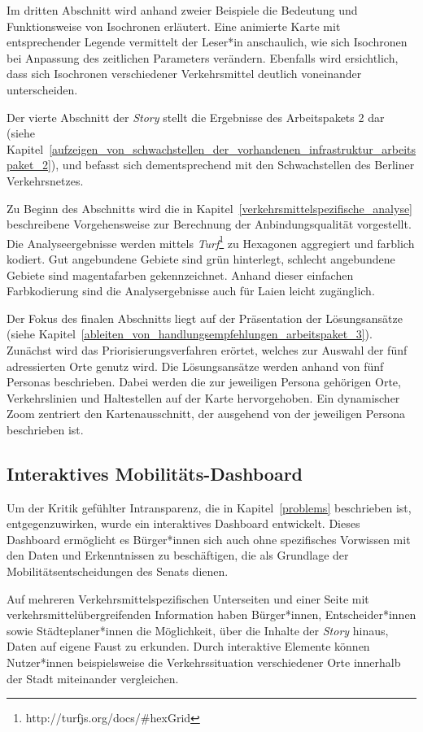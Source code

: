 Im dritten Abschnitt wird anhand zweier Beispiele die Bedeutung und Funktionsweise von Isochronen erläutert. Eine animierte Karte mit entsprechender Legende vermittelt der Leser*in anschaulich, wie sich Isochronen bei Anpassung des zeitlichen Parameters verändern. Ebenfalls wird ersichtlich, dass sich Isochronen verschiedener Verkehrsmittel deutlich voneinander unterscheiden.

Der vierte Abschnitt der \emph{Story} stellt die Ergebnisse des Arbeitspakets 2 dar (siehe Kapitel~\ref{aufzeigen_von_schwachstellen_der_vorhandenen_infrastruktur_arbeitspaket_2}), und befasst sich dementsprechend  mit den Schwachstellen des Berliner Verkehrsnetzes.

Zu Beginn des Abschnitts wird die in Kapitel~\ref{verkehrsmittelspezifische_analyse} beschreibene Vorgehensweise zur Berechnung der Anbindungsqualität vorgestellt. Die Analyseergebnisse werden mittels \emph{Turf}\footnote{http://turfjs.org/docs/\#hexGrid} zu Hexagonen aggregiert und farblich kodiert. Gut angebundene Gebiete sind  grün hinterlegt, schlecht angebundene Gebiete sind magentafarben gekennzeichnet. Anhand dieser einfachen Farbkodierung sind die Analysergebnisse auch für Laien leicht zugänglich.

Der Fokus des finalen Abschnitts liegt auf der Präsentation der Lösungsansätze (siehe Kapitel~\ref{ableiten_von_handlungsempfehlungen_arbeitspaket_3}). Zunächst wird das Priorisierungsverfahren erörtet, welches zur Auswahl der fünf adressierten Orte genutz wird. Die Lösungsansätze werden anhand von fünf Personas beschrieben. Dabei werden die zur jeweiligen Persona gehörigen Orte, Verkehrslinien und Haltestellen auf der Karte hervorgehoben. Ein dynamischer Zoom zentriert den Kartenausschnitt, der ausgehend von der jeweiligen Persona beschrieben ist.

\subsection{Interaktives Mobilitäts-Dashboard}
\label{interaktives_mobilitaets_dashboard}

Um der Kritik gefühlter Intransparenz, die in Kapitel~\ref{problems} beschrieben ist, entgegenzuwirken, wurde ein interaktives Dashboard entwickelt. Dieses Dashboard ermöglicht es Bürger*innen sich auch ohne spezifisches Vorwissen mit den Daten und Erkenntnissen zu beschäftigen, die als Grundlage der Mobilitätsentscheidungen des Senats dienen.

Auf mehreren Verkehrsmittelspezifischen Unterseiten und einer Seite mit verkehrsmittelübergreifenden Information haben Bürger*innen, Entscheider*innen sowie Städteplaner*innen die Möglichkeit, über die Inhalte der \emph{Story} hinaus, Daten auf eigene Faust zu erkunden. Durch interaktive Elemente können Nutzer*innen beispielsweise die Verkehrssituation verschiedener Orte innerhalb der Stadt miteinander vergleichen.


